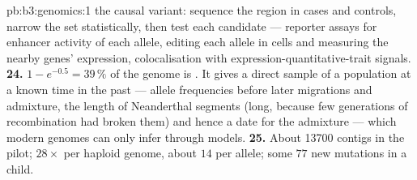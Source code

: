 \begin{solution}{pb:b3:genomics:1}
the causal variant: sequence the region in cases and controls, narrow
the set statistically, then test each candidate --- reporter assays
for enhancer activity of each allele, editing each allele in cells and
measuring the nearby genes' expression, colocalisation with
expression-quantitative-trait signals.
\textbf{24.} $1 - e^{-0.5} = 39\,\%$ of the genome is . It gives a
direct sample of a population at a known time in the past --- allele
frequencies before later migrations and admixture, the length of
Neanderthal segments (long, because few generations of recombination
had broken them) and hence a date for the admixture --- which modern
genomes can only infer through models.
\textbf{25.} About \num{13700} contigs in the pilot; $28\times$ per
haploid genome, about $14$  per allele; some $77$ new mutations in
a child.
\end{solution}
